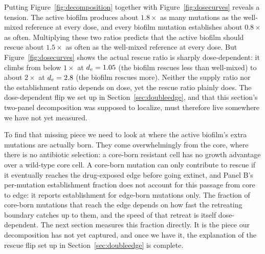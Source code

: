 Putting Figure~\ref{fig:decomposition} together with Figure~\ref{fig:dosecurves} reveals a tension. The active biofilm produces about $1.8\times$ as many mutations as the well-mixed reference at every dose, and every biofilm mutation establishes about $0.8\times$ as often. Multiplying these two ratios predicts that the active biofilm should rescue about $1.5\times$ as often as the well-mixed reference at every dose. But Figure~\ref{fig:dosecurves} shows the actual rescue ratio is sharply dose-dependent: it climbs from below $1\times$ at $d_e = 1.05$ (the biofilm rescues less than well-mixed) to about $2\times$ at $d_e = 2.8$ (the biofilm rescues more). Neither the supply ratio nor the establishment ratio depends on dose, yet the rescue ratio plainly does. The dose-dependent flip we set up in Section~\ref{sec:doubleedge}, and that this section's two-panel decomposition was supposed to localize, must therefore live somewhere we have not yet measured.

To find that missing piece we need to look at where the active biofilm's extra mutations are actually born. They come overwhelmingly from the core, where there is no antibiotic selection: a core-born resistant cell has no growth advantage over a wild-type core cell. A core-born mutation can only contribute to rescue if it eventually reaches the drug-exposed edge before going extinct, and Panel B's per-mutation establishment fraction does not account for this passage from core to edge: it reports establishment for edge-born mutations only. The fraction of core-born mutations that reach the edge depends on how fast the retreating boundary catches up to them, and the speed of that retreat is itself dose-dependent. The next section measures this fraction directly. It is the piece our decomposition has not yet captured, and once we have it, the explanation of the rescue flip set up in Section~\ref{sec:doubleedge} is complete.

